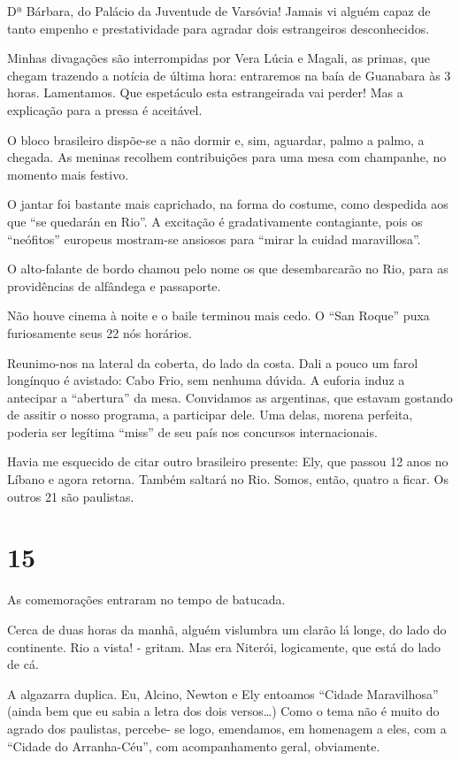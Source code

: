 Dª Bárbara, do Palácio da Juventude de Varsóvia! Jamais vi alguém capaz de tanto empenho e prestatividade para agradar dois estrangeiros desconhecidos.

Minhas divagações são interrompidas por Vera Lúcia e Magali, as primas, que chegam trazendo a notícia de última hora: entraremos na baía de Guanabara às 3 horas. Lamentamos. Que espetáculo esta estrangeirada vai perder! Mas a explicação para a pressa é aceitável.

O bloco brasileiro dispõe-se a não dormir e, sim, aguardar, palmo a palmo, a chegada. As meninas recolhem contribuições para uma mesa com champanhe, no momento mais festivo.

O jantar foi bastante mais caprichado, na forma do costume, como despedida aos que “se quedarán en Rio”. A excitação é gradativamente contagiante, pois os “neófitos” europeus mostram-se ansiosos para “mirar la cuidad maravillosa”.

O alto-falante de bordo chamou pelo nome os que desembarcarão no Rio, para as providências de alfândega e passaporte.

Não houve cinema à noite e o baile terminou mais cedo. O “San Roque” puxa furiosamente seus 22 nós horários.

Reunimo-nos na lateral da coberta, do lado da costa. Dali a pouco um farol longínquo é avistado: Cabo Frio, sem nenhuma dúvida. A euforia induz a antecipar a “abertura” da mesa. Convidamos as argentinas, que estavam gostando de assitir o nosso programa, a participar dele. Uma delas, morena perfeita, poderia ser legítima “miss” de seu país nos concursos internacionais.

Havia me esquecido de citar outro brasileiro presente: Ely, que passou 12 anos no Líbano e agora retorna. Também saltará no Rio. Somos, então, quatro a ficar. Os outros 21 são paulistas.

\section*{15 \adfflatleafright {}}
As comemorações entraram no tempo de batucada.

Cerca de duas horas da manhã, alguém vislumbra um clarão lá longe, do lado do continente. Rio a vista! - gritam. Mas era Niterói, logicamente, que está do lado de cá.

A algazarra duplica. Eu, Alcino, Newton e Ely entoamos “Cidade Maravilhosa” (ainda bem que eu sabia a letra dos dois versos\ldots) Como o tema não é muito do agrado dos paulistas, percebe- se logo, emendamos, em homenagem a eles, com a “Cidade do Arranha-Céu”, com acompanhamento geral, obviamente.

